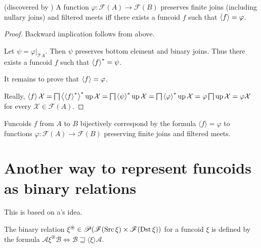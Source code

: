 \begin{thm}
\label{fcd-as-func}(discovered by ) A function
$\varphi:\mathscr{F}(A)\rightarrow\mathscr{F}(B)$ preserves finite
joins (including nullary joins) and filtered meets iff there exists
a funcoid $f$ such that $\left\langle f\right\rangle=\varphi$.\end{thm}
\begin{proof}
Backward implication follows from above.

Let $\psi=\varphi|_{\mathscr{T}A}$. Then $\psi$ preserves bottom
element and binary joins. Thus there exists a funcoid $f$ such that
$\left\langle f\right\rangle ^{\ast}=\psi$.

It remains to prove that $\left\langle f\right\rangle=\varphi$.

Really, $\left\langle f\right\rangle\mathcal{X}=\bigsqcap\left\langle \left\langle f\right\rangle ^{\ast}\right\rangle ^{\ast}\operatorname{up}\mathcal{X}=\bigsqcap\left\langle \psi\right\rangle ^{\ast}\operatorname{up}\mathcal{X}=\bigsqcap\left\langle \varphi
\right\rangle ^{\ast}\operatorname{up}\mathcal{X}=\varphi\bigsqcap\operatorname{up}\mathcal{X}=\varphi\mathcal{X}$
for every $\mathcal{X}\in\mathscr{F}(A)$.\end{proof}
\begin{cor}
Funcoids $f$ from $A$ to $B$ bijectively correspond by the formula
$\langle f\rangle=\varphi$ to functions
$\varphi:\mathscr{F}(A)\rightarrow\mathscr{F}(B)$
preserving finite joins and filtered meets.
\end{cor}

\section{\label{fcd-rel-another}Another way to represent funcoids as binary
relations}

This is based on a's idea.
\begin{defn}
The binary relation
$\xi^{\circledast}\in\mathscr{P}(\mathscr{F}(\operatorname{Src}\xi)\times\mathscr{F}(\operatorname{Dst}\xi))$
for a funcoid $\xi$ is defined by the formula
$\mathcal{A}\mathrel{\xi^{\circledast}}\mathcal{B}\Leftrightarrow\mathcal{B}
\sqsupseteq\langle\xi\rangle\mathcal{A}$.
\end{defn}


